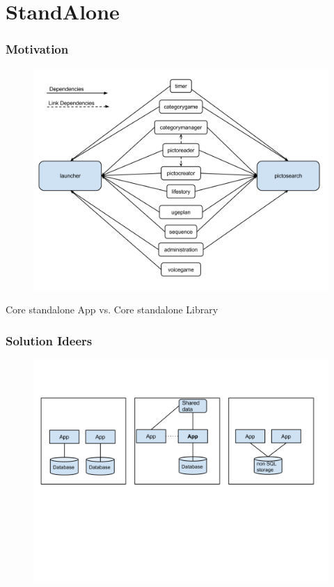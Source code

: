 \section{StandAlone}
\begin{frame}
	\frametitle{Motivation}
	\begin{figure}[H]
				\centering
				\includegraphics[width= 0.8 \textwidth]{pictures/AppAppdependencies.png}
	\end{figure}
	Core standalone App vs. Core standalone Library
\end{frame}
\begin{frame}
	\frametitle{Solution Ideers}
	\begin{figure}[H]
				\centering
				\includegraphics[width= 0.8 \textwidth]{pictures/Corelib.png}
	\end{figure}
\end{frame}